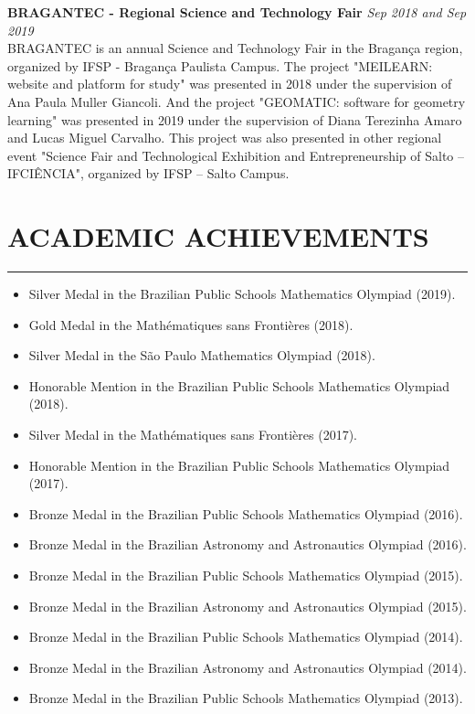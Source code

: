 \documentclass[a4paper,10pt]{article}
\begin{document}
\noindent\textbf{BRAGANTEC - Regional Science and Technology Fair} \hfill \textit{Sep 2018 and Sep 2019}\\
BRAGANTEC is an annual Science and Technology Fair in the Bragança region, organized by IFSP - Bragança Paulista Campus. The project "MEILEARN: website and platform for study" was presented in 2018 under the supervision of Ana Paula Muller Giancoli. And the project "GEOMATIC: software for geometry learning" was presented in 2019 under the supervision of Diana Terezinha Amaro and Lucas Miguel Carvalho. This project was also presented in other regional event "Science Fair and Technological Exhibition and Entrepreneurship of Salto – IFCIÊNCIA", organized by IFSP – Salto Campus.
%


\section*{ACADEMIC ACHIEVEMENTS}
\vspace{-1.5em} %
\noindent\rule{\textwidth}{0.4pt} %
\begin{itemize} 
    \item Silver Medal in the Brazilian Public Schools Mathematics Olympiad (2019).
    \item Gold Medal in the Mathématiques sans Frontières (2018).
    \item Silver Medal in the São Paulo Mathematics Olympiad (2018).
    \item Honorable Mention in the Brazilian Public Schools Mathematics Olympiad (2018).
    \item Silver Medal in the Mathématiques sans Frontières (2017).
    \item Honorable Mention in the Brazilian Public Schools Mathematics Olympiad (2017).
    \item Bronze Medal in the Brazilian Public Schools Mathematics Olympiad (2016).
    \item Bronze Medal in the Brazilian Astronomy and Astronautics Olympiad (2016).
    \item Bronze Medal in the Brazilian Public Schools Mathematics Olympiad (2015).
    \item Bronze Medal in the Brazilian Astronomy and Astronautics Olympiad (2015).
    \item Bronze Medal in the Brazilian Public Schools Mathematics Olympiad (2014).
    \item Bronze Medal in the Brazilian Astronomy and Astronautics Olympiad (2014).
    \item Bronze Medal in the Brazilian Public Schools Mathematics Olympiad (2013).
\end{itemize}
\end{document}
